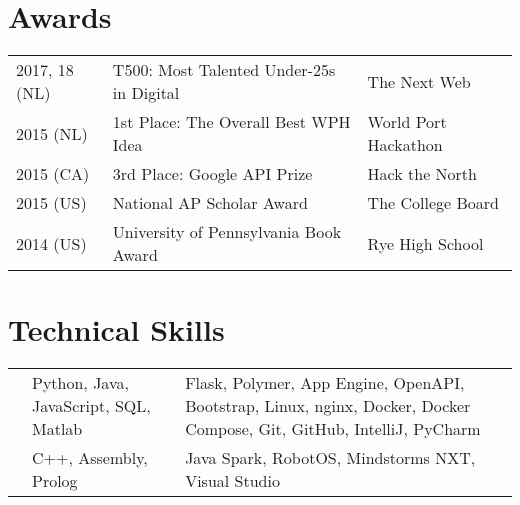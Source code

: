 \documentclass[]{deedy-resume-openfont}
\begin{document}
\begin{minipage}[t]{0.66\textwidth}
\section{Awards} 
\begin{tabular}{lll}
2017, 18 (NL)   & T500: Most Talented Under-25s in Digital  & The Next Web\\
2015 (NL)   & 1st Place: The Overall Best WPH Idea      & World Port Hackathon\\
2015 (CA)   & 3rd Place: Google API Prize               & Hack the North\\
2015 (US)   & National AP Scholar Award                 & The College Board\\
2014 (US)   & University of Pennsylvania Book Award     & Rye High School\\
\end{tabular}
\vspace{0.1\topsep}


\section{Technical Skills}
\vspace{-\topsep}
\settowidth{}
\begin{tabulary}{\linewidth}{LLL}
    &  &  \\
    \hline
     & Python, Java, JavaScript, SQL, Matlab & Flask, Polymer, App Engine, OpenAPI, Bootstrap, Linux, nginx, Docker, Docker Compose, Git, GitHub, IntelliJ, PyCharm \\
    \hline
     & C++, Assembly, Prolog & Java Spark, RobotOS, Mindstorms NXT, Visual Studio
\end{tabulary} 

\end{minipage} 
\end{document}
